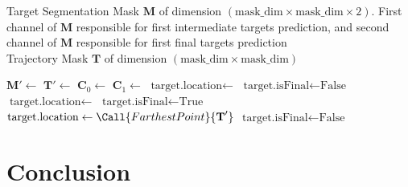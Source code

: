 \documentclass[letterpaper, 10 pt, conference]{ieeeconf}  %
\begin{document}
\begin{algorithm}
    \caption{Target Determination}
    Target Segmentation Mask $\textbf{M}$ of dimension $(\textrm{mask\_dim} \times \textrm{mask\_dim} \times 2)$. First channel of $\textbf{M}$ responsible for first intermediate targets prediction, and second channel of $\textbf{M}$ responsible for first final targets prediction \\
    Trajectory Mask $\textbf{T}$ of dimension $(\textrm{mask\_dim} \times \textrm{mask\_dim})$
    \begin{algorithmic}[1]
            \State $\textbf{M}' \gets$ 
            \State $\textbf{T}' \gets$ 
            \State $\textbf{C}_0 \gets$ 
            \State $\textbf{C}_1 \gets$ 
                    \State $\textrm{target.location} \gets$ 
                    \State $\textrm{target.isFinal} \gets \textrm{False}$
                \Else
                    \State $\textrm{target.location} \gets$ 
                    \State $\textrm{target.isFinal} \gets \textrm{True}$
                \EndIf
                \Else
                    \State $\textrm{target.location} \gets \Call{FarthestPoint}{\textbf{T}'}$
                    \State $\textrm{target.isFinal} \gets \textrm{False}$
            \EndIf
        \EndProcedure
    \end{algorithmic}
\end{algorithm}

\section{Conclusion}



\end{document}
